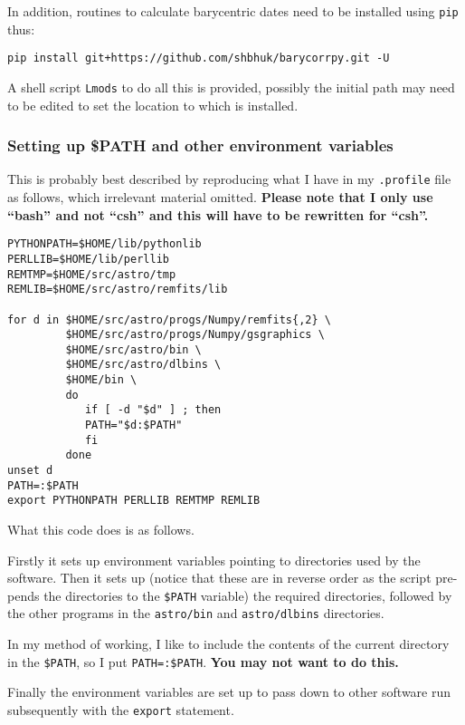 \vspace{10pt}
In addition, routines to calculate barycentric dates need to be installed using
\texttt{pip} thus:

\begin{verbatim}
pip install git+https://github.com/shbhuk/barycorrpy.git -U
\end{verbatim}

A shell script \texttt{Lmods} to do all this is provided, possibly the initial
path may need to be edited to set the location to which {\anac} is installed.

\subsubsection{Setting up \$PATH and other environment variables}
\protect\label{section:pathsetting}

This is probably best described by reproducing what I have in my
\texttt{.profile} file as follows, which irrelevant material omitted.
\textbf{Please note that I only use ``bash'' and not ``csh'' and this will have to be rewritten for ``csh''.}

\begin{verbatim}
PYTHONPATH=$HOME/lib/pythonlib
PERLLIB=$HOME/lib/perllib
REMTMP=$HOME/src/astro/tmp
REMLIB=$HOME/src/astro/remfits/lib

for d in $HOME/src/astro/progs/Numpy/remfits{,2} \
		 $HOME/src/astro/progs/Numpy/gsgraphics \
		 $HOME/src/astro/bin \
		 $HOME/src/astro/dlbins \
		 $HOME/bin \
		 do
			if [ -d "$d" ] ; then
    		PATH="$d:$PATH"
    	    fi
		 done
unset d
PATH=:$PATH
export PYTHONPATH PERLLIB REMTMP REMLIB
\end{verbatim}

What this code does is as follows.

Firstly it sets up environment variables pointing to directories used by the
software. Then it sets up (notice that these are in reverse order as the script
pre-pends the directories to the \texttt{\$PATH} variable) the required
directories, followed by the other programs in the \texttt{astro/bin} and \texttt{astro/dlbins} directories.

In my method of working, I like to include the contents of the current directory
in the \texttt{\$PATH}, so I put \texttt{PATH=:\$PATH}. \textbf{You may not
want to do this.}

Finally the environment variables are set up to pass down to other software run
subsequently with the \texttt{export} statement.

